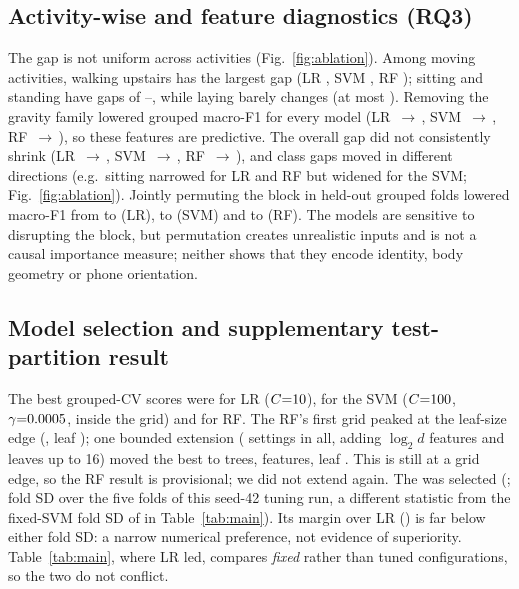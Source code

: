 \documentclass{article}
\begin{document}
\subsection{Activity-wise and feature diagnostics (RQ3)}
The gap is not uniform across activities (Fig.~\ref{fig:ablation}). Among moving activities, walking upstairs has the largest gap (LR \NdropLRUpstairs, SVM \NdropSVMUpstairs, RF \NdropRFUpstairs); sitting and standing have gaps of \NdropSVMStand--\NdropRFSit, while laying barely changes (at most \NdropLRLay).
Removing the gravity family lowered grouped macro-F1 for every model (LR \NablLRMacroPfull{}\,$\to$\,\NablLRMacroPng, SVM \NablSVMMacroPfull{}\,$\to$\,\NablSVMMacroPng, RF \NablRFMacroPfull{}\,$\to$\,\NablRFMacroPng), so these features are predictive. The overall gap did not consistently shrink (LR \NablLRMacrofull{}\,$\to$\,\NablLRMacrong, SVM \NablSVMMacrofull{}\,$\to$\,\NablSVMMacrong, RF \NablRFMacrofull{}\,$\to$\,\NablRFMacrong), and class gaps moved in different directions (e.g.\ sitting narrowed for LR and RF but widened for the SVM; Fig.~\ref{fig:ablation}). Jointly permuting the block in held-out grouped folds lowered macro-F1 from \NpermLRbase{} to \NpermLR{} (LR), \NpermSVMbase{} to \NpermSVM{} (SVM) and \NpermRFbase{} to \NpermRF{} (RF). The models are sensitive to disrupting the block, but permutation creates unrealistic inputs and is not a causal importance measure; neither shows that they encode identity, body geometry or phone orientation.

\subsection{Model selection and supplementary test-partition result}
\label{sec:select}
The best grouped-CV scores were \NtuneLR{} for LR ($C{=}10$), \NtuneSVM{} for the SVM ($C{=}100$, $\gamma{=}0.0005$, inside the grid) and \NtuneRF{} for RF. The RF's first grid peaked at the leaf-size edge (\NtuneRFone, leaf \NtuneRFoneleaf); one bounded extension (\NtuneRFn{} settings in all, adding $\log_2 d$ features and leaves up to 16) moved the best to \NtuneRFtrees{} trees, \NtuneRFmf{} features, leaf \NtuneRFleaf. This is still at a grid edge, so the RF result is provisional; we did not extend again. The \Nselmodel{} was selected (\Nselcv; fold SD \Nselcvsd{} over the five folds of this seed-42 tuning run, a different statistic from the fixed-SVM fold SD of \NfsdSVMP{} in Table~\ref{tab:main}). Its margin over LR (\Nselmargin) is far below either fold SD: a narrow numerical preference, not evidence of superiority. Table~\ref{tab:main}, where LR led, compares \emph{fixed} rather than tuned configurations, so the two do not conflict.
\end{document}
